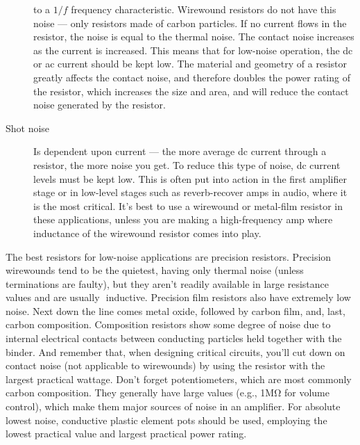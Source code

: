 \documentclass[../../document]{subfiles}
\begin{document}
\begin{description}
		to a \(1/f\) frequency characteristic. Wirewound resistors do not have this
		noise --- only resistors made of carbon particles. If no current  flows in
		the resistor, the noise is equal to the thermal noise. The contact noise
		increases as the current is increased. This means that for low-noise
		operation, the dc or ac current should be kept low. The material and
		geometry of a resistor greatly affects the contact noise, and therefore
		doubles the power rating of the resistor, which increases the size and
		area, and will reduce the contact noise generated by the resistor.
	\item[Shot noise] Is dependent upon current --- the more average dc current
		through a resistor, the more noise you get. To reduce this type of noise,
		dc current levels must be kept low. This is often put into action in the
		first amplifier stage or in low-level stages such as reverb-recover amps in
		audio, where it is the most critical. It’s best to use a wirewound or
		metal-film resistor in these applications, unless you are making a
		high-frequency amp where inductance of the wirewound resistor comes into
		play.
\end{description}

The best resistors for low-noise applications are precision resistors.
Precision wirewounds tend to be the quietest, having only thermal noise (unless
terminations are faulty), but they aren’t readily available in large resistance
values and are usually ­ inductive. Precision film resistors also have
extremely low noise. Next down the line comes metal oxide, followed by carbon
film, and, last, carbon composition. Composition resistors show some degree of
noise due to internal electrical contacts between conducting particles held
together with the binder. And remember that, when designing critical circuits,
you’ll cut down on contact noise (not applicable to wirewounds) by using the
resistor with the largest practical wattage. Don’t forget potentiometers, which
are most commonly carbon composition. They generally have large values (e.g.,
1\unit{\mega\ohm} for volume control), which make them major sources of noise
in an amplifier. For absolute lowest noise, conductive plastic element pots
should be used, employing the lowest practical value and largest practical
power rating. \cite{practical_electronics}
\end{document}
